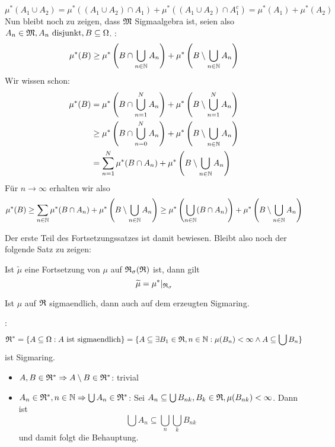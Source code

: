 \begin{bew}
				\[ \mu^*(A_1\cup A_2)=\mu^*((A_1\cup A_2)\cap A_1)+\mu^*((A_1\cup A_2)\cap A_1^c)=\mu^*(A_1)+\mu^*(A_2) \]
				Nun bleibt noch zu zeigen, dass $\mathfrak{M}$ Sigmaalgebra ist, seien also $A_n\in \mathfrak{M}, A_n\text{ disjunkt}, B\subseteq \Omega$.\newline
				\zz:
				\[ \mu^*(B)\ge \mu^*\left(B\cap \bigcup_{n\in \mathbb{N}} A_n\right)+\mu^*\left(B\setminus \bigcup_{n\in\mathbb{N}} A_n\right) \]
				Wir wissen schon:
				\begin{align*}
				\mu^*(B)&=\mu^*\left(B\cap \bigcup_{n=1}^N A_n\right)+\mu^*\left(B\setminus\bigcup_{n=1}^N A_n\right)\\
				&\ge \mu^*\left(B\cap \bigcup_{n=0}^N A_n\right)+\mu^*\left(B\setminus\bigcup_{n\in\mathbb{N}} A_n\right)\\
				&=\sum_{n=1}^N\mu^*(B\cap A_n)+\mu^*\left(B\setminus\bigcup_{n\in\mathbb{N}} A_n\right)\\
				\end{align*}
				Für $n\to\infty$ erhalten wir also
				\[ \mu^*(B)\ge \sum_{n\in\mathbb{N}} \mu^*(B\cap A_n)+\mu^*\left(B \setminus \bigcup_{n\in\mathbb{N}} A_n\right)\ge\mu^*\left(\bigcup_{n\in\mathbb{N}} (B\cap A_n)\right)+\mu^*\left(B\setminus\bigcup_{n\in\mathbb{N}} A_n\right) \]
				\arge
			\end{bew}
			
			\begin{bem}
				Der erste Teil des Fortsetzungssatzes ist damit bewiesen. Bleibt also noch der folgende Satz zu zeigen:
			\end{bem}
			
			\begin{satz}
				Ist $\widetilde{\mu}$ eine Fortsetzung von $\mu$ auf $\mathfrak{R}_\sigma(\mathfrak{R})$ ist, dann gilt 
				\[ \widetilde{\mu}=\mu^*|_{\mathfrak{R}_\sigma} \]
			\end{satz}
			
			\begin{satz}
				Ist $\mu$ auf $\mathfrak{R}$ sigmaendlich, dann auch auf dem erzeugten Sigmaring.
			\end{satz}
			
			\begin{bew}
				\zz:
				\[ \mathfrak{R}^*=\{A\subseteq \Omega: A \text{ ist sigmaendlich}\}=\{A\subseteq \exists B_1\in\mathfrak{R}, n\in\mathbb{N}: \mu(B_n)<\infty \land A\subseteq\bigcup B_n\} \]
				ist Sigmaring. \newline
				\begin{itemize}
					\item $A,B\in\mathfrak{R}^*\Rightarrow A\setminus B\in\mathfrak{R}^*$: trivial
					\item $A_n\in\mathfrak{R}^*, n\in\mathbb{N}\Rightarrow \bigcup A_n\in\mathfrak{R}^*$:\newline
					Sei $A_n\subseteq \bigcup B_{nk}, B_{k}\in\mathfrak{R}, \mu(B_{nk})<\infty$. Dann ist
					\[ \bigcup A_n\subseteq \bigcup_{n}\bigcup_k B_{nk} \]
					und damit folgt die Behauptung.
				\end{itemize}
			\end{bew}
			
